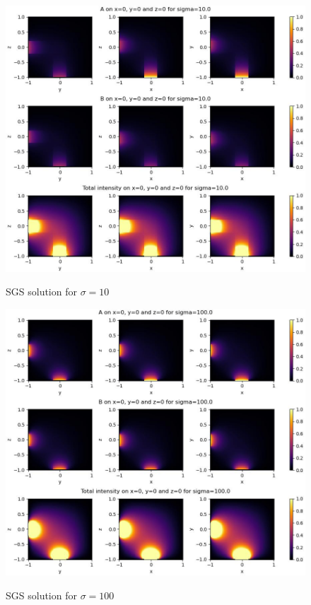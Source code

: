 \documentclass[11pt,titlepage]{article}
\begin{document}
\begin{figure}[H]
    \caption{SGS solution for $\sigma=10$}
    \hspace*{-2cm}\centering
    \includegraphics[scale=0.8]{img/2d_sym_gauss_seidel_10.0.jpg}
    \label{fig:sgs_10}
\end{figure}

\begin{figure}[H]
    \caption{SGS solution for $\sigma=100$}
    \hspace*{-2cm}\centering
    \includegraphics[scale=0.8]{img/2d_sym_gauss_seidel_100.0.jpg}
    \label{fig:sgs_100}
\end{figure}
\end{document}
